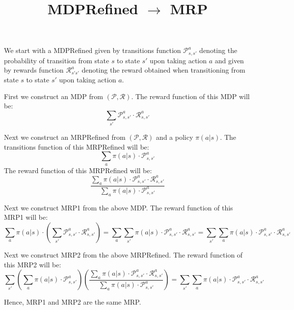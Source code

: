\documentclass[12pt]{amsart}
\title{MDPRefined $\rightarrow$ MRP}
\author{}
\date{} %
\begin{document}
\maketitle

We start with a MDPRefined given by transitions function $\mathcal{P}_{s,s'}^a$ denoting the probability of transition from state $s$ to state $s'$ upon taking action $a$ and given by rewards function $\mathcal{R}_{s's'}^a$ denoting the reward obtained when transitioning from state $s$ to state $s'$ upon taking action $a$.

First we construct an MDP from $(\mathcal{P}, \mathcal{R})$. The reward function of this MDP will be:
$$\sum_{s'} \mathcal{P}_{s,s'}^a \cdot \mathcal{R}_{s,s'}^a$$

Next we construct an MRPRefined from $(\mathcal{P}, \mathcal{R})$ and a policy $\pi(a|s)$. The transitions function of this MRPRefined will be:
$$\sum_a \pi(a|s) \cdot \mathcal{P}_{s,s'}^a$$
The reward function of this MRPRefined will be:
$$\frac {\sum_a \pi(a|s) \cdot \mathcal{P}_{s,s'}^a \cdot \mathcal{R}_{s,s'}^a} {\sum_a \pi(a|s) \cdot \mathcal{P}_{s,s'}^a}$$

Next we construct MRP1 from the above MDP. The reward function of this MRP1 will be:
$$\sum_a \pi(a|s) \cdot (\sum_{s'} \mathcal{P}_{s,s'}^a \cdot \mathcal{R}_{s,s'}^a) = \sum_a \sum_{s'} \pi(a|s) \cdot \mathcal{P}_{s,s'}^a \cdot \mathcal{R}_{s,s'}^a = \sum_{s'} \sum_a \pi(a|s) \cdot \mathcal{P}_{s,s'}^a \cdot \mathcal{R}_{s,s'}^a $$

Next we construct MRP2 from the above MRPRefined. The reward function of this MRP2 will be:
$$\sum_{s'} (\sum_a \pi(a|s) \cdot \mathcal{P}_{s,s'}^a) (\frac {\sum_a \pi(a|s) \cdot \mathcal{P}_{s,s'}^a \cdot \mathcal{R}_{s,s'}^a} {\sum_a \pi(a|s) \cdot \mathcal{P}_{s,s'}^a}) =  \sum_{s'} \sum_a \pi(a|s) \cdot \mathcal{P}_{s,s'}^a \cdot \mathcal{R}_{s,s'}^a $$

Hence, MRP1 and MRP2 are the same MRP.
\end{document}
